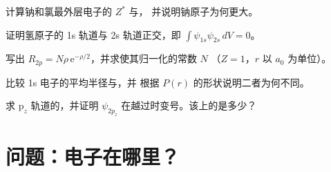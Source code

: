 \begin{exercise}[$\star\star$]\label{exo:b2:atomic-orbitals:8}
计算钠和氯最外层电子的 $Z^*$ 与，
并说明钠原子为何更大。
\end{exercise}

\begin{exercise}[$\star\star$]\label{exo:b2:atomic-orbitals:9}
证明氢原子的 1s 轨道与 2s 轨道正交，即
$\int\psi_{1s}\psi_{2s}\,dV = 0$。
\end{exercise}

\begin{exercise}[$\star\star\star$]\label{exo:b2:atomic-orbitals:10}
写出 $R_{2p} = N\rho\,\mathrm e^{-\rho/2}$，并求使其归一化的常数 $N$
（$Z = 1$，$r$ 以 $a_0$ 为单位）。
\end{exercise}

\begin{exercise}[$\star\star\star$]\label{exo:b2:atomic-orbitals:11}
比较 1s 电子的平均半径与，并
根据 $P(r)$ 的形状说明二者为何不同。
\end{exercise}

\begin{exercise}[$\star\star\star$]\label{exo:b2:atomic-orbitals:12}
求 $\mathrm p_z$ 轨道的，并证明 $\psi_{2p_z}$
在越过时变号。该上的是多少？
\end{exercise}

\section{问题：电子在哪里？}

